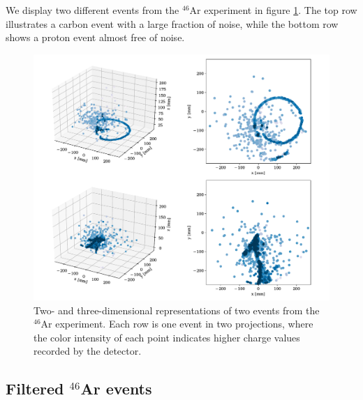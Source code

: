\documentclass[review,number,sort&compress]{elsarticle}
\begin{document}

We display two different events from the ${}^{46}$Ar experiment in figure \ref{fig:samples}. The top row illustrates a carbon event with a large fraction of noise, while the bottom row shows a proton event almost free of noise.

\begin{figure}[ht]
\centering
\includegraphics[width=\textwidth]{custom_work/examples_raw.pdf}
\caption[Displaying unfiltered events in two and three dimensions]{Two- and three-dimensional representations of two events from the ${}^{46}$Ar experiment. Each row is one event in two projections, where the color intensity of each point indicates higher charge values recorded by the detector.}\label{fig:samples}
\end{figure}

\subsection{Filtered \texorpdfstring{${}^{46}$Ar}{46Ar} events}\label{sec:filtered}
\end{document}
